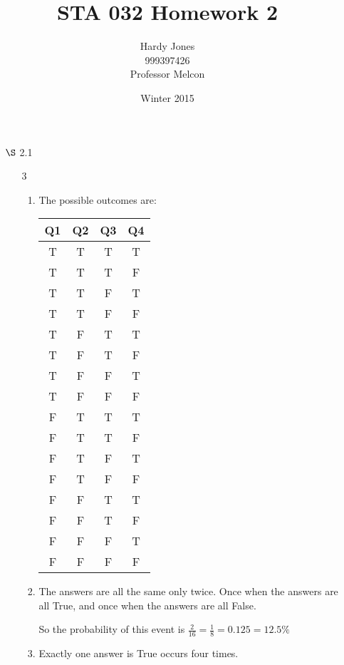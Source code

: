 \documentclass[12pt,letterpaper]{article}
\title{STA 032 Homework 2\vspace{-2ex}}
\author{Hardy Jones\\
        999397426\\
        Professor Melcon\vspace{-2ex}}
\date{Winter 2015}
\begin{document}
  \maketitle

  \begin{enumerate}
    \item [$\S$ 2.1]
      \begin{enumerate}
        \item [3]
          \begin{enumerate}[label=(\arabic*)]
            \item
              The possible outcomes are:

              \begin{tabular}{| c | c | c | c |}
                \hline
                Q1 & Q2 & Q3 & Q4 \\
                \hline
                T & T & T & T \\
                T & T & T & F \\
                T & T & F & T \\
                T & T & F & F \\
                T & F & T & T \\
                T & F & T & F \\
                T & F & F & T \\
                T & F & F & F \\
                F & T & T & T \\
                F & T & T & F \\
                F & T & F & T \\
                F & T & F & F \\
                F & F & T & T \\
                F & F & T & F \\
                F & F & F & T \\
                F & F & F & F \\
                \hline
              \end{tabular}
            \item
              The answers are all the same only twice.
              Once when the answers are all True,
              and once when the answers are all False.

              So the probability of this event is $\frac{2}{16} = \frac{1}{8} = 0.125 = 12.5\%$
            \item
              Exactly one answer is True occurs four times.


\end{enumerate}
\end{enumerate}
\end{enumerate}
\end{document}
